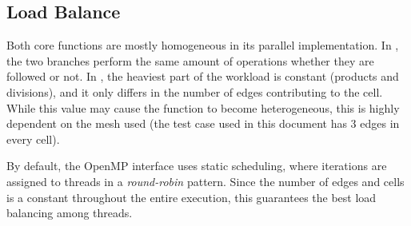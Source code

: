 \subsection{Load Balance}
\label{sec:omp:load}


Both core functions are mostly homogeneous in its parallel implementation.
In \computeflux, the two branches perform the same amount of operations whether they are followed or not.
In \update, the heaviest part of the workload is constant (products and divisions), and it only differs in the number of edges contributing to the cell.
While this value may cause the function to become heterogeneous, this is highly dependent on the mesh used (the test case used in this document has 3 edges in every cell).

By default, the OpenMP interface uses static scheduling, where iterations are assigned to threads in a \textit{round-robin} pattern.
Since the number of edges and cells is a constant throughout the entire execution, this guarantees the best load balancing among threads.

